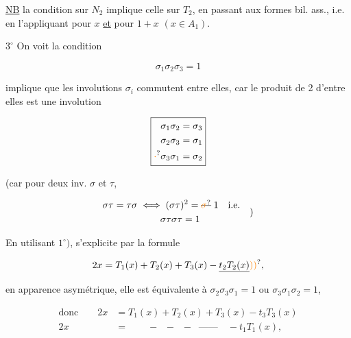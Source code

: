 \uline{NB} la condition sur $N_2$ implique celle sur $T_2$, en passant aux formes bil. ass., i.e. en l'appliquant pour $x$ \uline{et} pour $1+x$ $(x\in A_1)$.

\textcircled{$3^\circ$} On voit la condition

\[
 \boxed{\sigma_1\sigma_2\sigma_3=1}
\]


implique que les involutions $\sigma_i$ commutent entre elles, car le produit de 2 d'entre elles est une involution

\[
 \boxed{\begin{aligned}\sigma_1\sigma_2&=\sigma_3\\
 \sigma_2\sigma_3&=\sigma_1\\
 \unsure{\cdot}\sigma_3\sigma_1&=\sigma_2\end{aligned}}
\]

(car pour deux inv. $\sigma$ et $\tau$,

\[
 \begin{aligned}
 \sigma\tau=\tau\sigma &\iff (\sigma\tau)^2=\deleted{\unsure{\sigma}}\;1\quad\text{i.e.}\\
 &\hphantom{\iff}\sigma\tau\sigma\tau=1
 \end{aligned}\quad\text{)}
\]

En utilisant $1^\circ)$,   s'explicite par la formule

\[
 2x=T_1(x)+T_2(x)+T_3(x)-\underline{t_2T_{2}(x)}\unsure{))},
\]

en apparence asymétrique,  elle est équivalente à $\sigma_2\sigma_3\sigma_1=1$ ou $\sigma_3\sigma_1\sigma_2=1$,

\[
 \begin{aligned}
 \text{donc}\qquad 2x&=T_1(x)+T_2(x)+T_3(x)-t_3T_3(x)\\
 2x&=\qquad -\;\;-\;\;-\;\;\text{——}\quad -t_1T_1(x),
 \end{aligned}
\]

